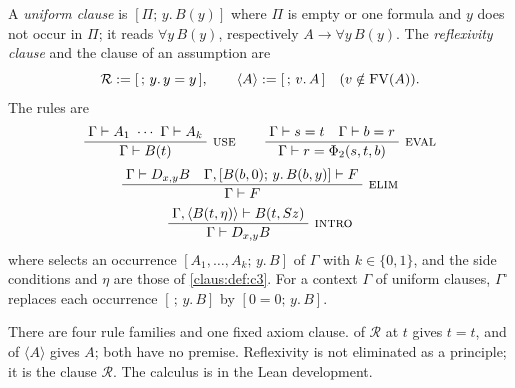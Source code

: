 \begin{definition}
\label{claus:def:v}
A \emph{uniform clause} is $[\Pi;\,y.\,B(y)]$ where $\Pi$ is empty or one
formula and $y$ does not occur in $\Pi$; it reads $\forall y\,B(y)$,
respectively $A\to\forall y\,B(y)$. The \emph{reflexivity clause} and the
clause of an assumption are
\[
 \mathcal{R}\mathrel{:=}[\,;\,y.\,y=y\,],\qquad
 \langle A\rangle\mathrel{:=}[\,;\,v.\,A\,]\quad(v\notin\operatorname{FV}(A)).
\]
The rules are
\[
 \infrule{\Gamma\proves A_1\ \cdots\ \Gamma\proves A_k}
         {\Gamma\proves B(t)}\ \rulename{Use}
 \qquad
 \infrule{\Gamma\proves s=t\quad\Gamma\proves b=r}
         {\Gamma\proves r=\Phi_2(s,t,b)}\ \rulename{Eval}
\]
\[
 \infrule{\Gamma\proves\D{x}{y}B\quad
          \Gamma,[B(b,0);\,y.\,B(b,y)]\proves F}
         {\Gamma\proves F}\ \rulename{Elim}
\]
\[
 \infrule{\Gamma,\langle B(t,\eta)\rangle\proves B(t,\Suc z)}
         {\Gamma\proves\D{x}{y}B}\ \rulename{Intro}
\]
where  selects an occurrence $[A_1,\dots,A_k;\,y.\,B]$ of
$\Gamma$ with $k\in\{0,1\}$, and the side conditions and $\eta$ are those
of \cref{claus:def:c3}. For a context $\Gamma$ of uniform clauses,
$\Gamma^{\circ}$ replaces each occurrence $[\,;\,y.\,B]$ by
$[0=0;\,y.\,B]$.
\end{definition}

There are four rule families and one fixed axiom clause.  of
$\mathcal{R}$ at $t$ gives $t=t$, and  of $\langle A\rangle$
gives $A$; both have no premise. Reflexivity is not eliminated as a
principle; it is the clause $\mathcal{R}$. The calculus is  in
the Lean development.

